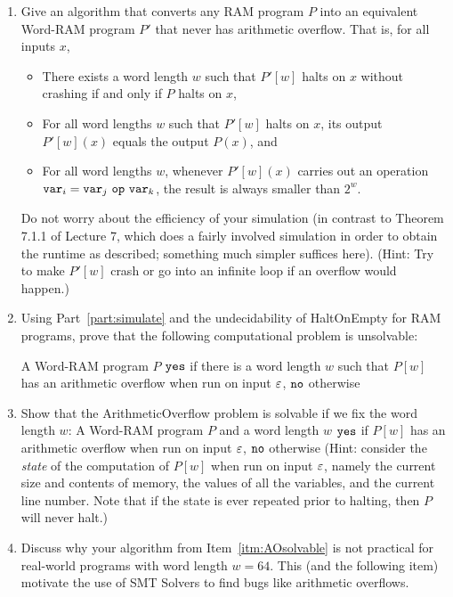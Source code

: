\documentclass[11pt]{article}
\begin{document}
\begin{enumerate}
  \begin{enumerate}
      \item Give an algorithm that converts any RAM program $P$ into an equivalent Word-RAM program $P'$ that never has arithmetic overflow.  That is, for all inputs $x$, 
      \begin{itemize}
          \item There exists a word length $w$ such that $P'[w]$ halts on $x$ without crashing if and only if $P$ halts on $x$, 
          \item For all word lengths $w$ such that $P'[w]$ halts on $x$, its output $P'[w](x)$ equals the output $P(x)$, and
          \item For all word lengths $w$, whenever $P'[w](x)$ carries out an operation $\var_i = \var_j\ \op\ \var_k$, the result is always smaller than $2^w$.  
      \end{itemize}
      Do not worry about the efficiency of your simulation (in contrast to Theorem 7.1.1 of Lecture 7, which does a fairly involved simulation in order to obtain the runtime as described; something much simpler suffices here).  (Hint: Try to make $P'[w]$ crash or go into an infinite loop if an overflow would happen.)
      \label{part:simulate}

      \item Using Part~\ref{part:simulate} and the undecidability of HaltOnEmpty for RAM programs, prove that the following computational problem is unsolvable:

    {A Word-RAM program $P$}
    {$\texttt{yes}$ if there is a word length $w$ such that $P[w]$ has an arithmetic overflow when run on input $\varepsilon$, $\texttt{no}$ otherwise}

    \item 
    \label{itm:AOsolvable}
    Show that the ArithmeticOverflow problem is solvable if we fix the word length $w$:
    {A Word-RAM program $P$ and a word length $w$}
    {$\texttt{yes}$ if $P[w]$ has an arithmetic overflow when run on input $\varepsilon$, $\texttt{no}$ otherwise}
    (Hint: consider the {\em state} of the computation of $P[w]$ when run on input $\varepsilon$, namely the current size and contents of memory, the values of all the variables, and the current line number.  Note that if the state is ever repeated prior to halting, then $P$ will never halt.) 

    \item Discuss why your algorithm from Item~\ref{itm:AOsolvable} is not practical for real-world programs with word length $w=64$. This (and the following item) motivate the use of SMT Solvers to find bugs like arithmetic overflows.


\end{enumerate}
\end{enumerate}
\end{document}
